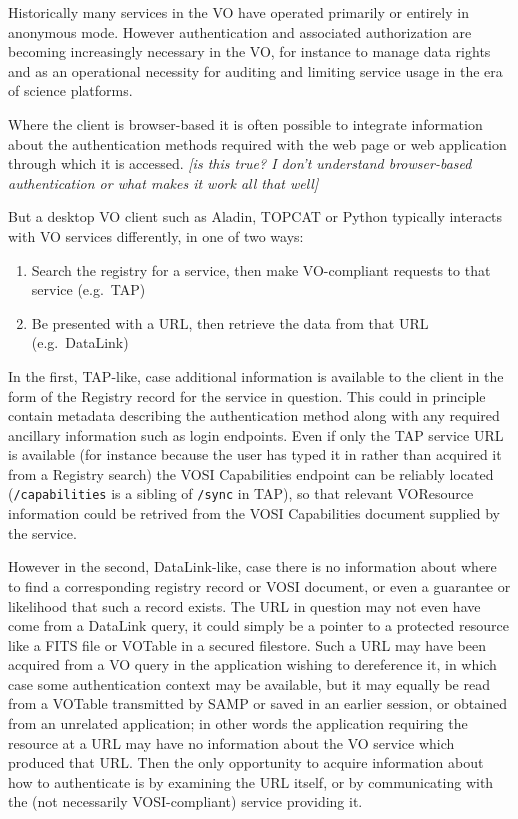 \documentclass[11pt,a4paper]{ivoa}
\begin{document}
Historically many services in the VO have operated primarily or
entirely in anonymous mode.
However authentication and associated authorization
are becoming increasingly necessary in the VO,
for instance to manage data rights and as an operational necessity for
auditing and limiting service usage in the era of science platforms.

Where the client is browser-based
it is often possible to integrate information about the authentication
methods required with the web page or web application through which
it is accessed.
{\em [is this true?  I don't understand browser-based authentication
or what makes it work all that well]}

But a desktop VO client such as Aladin, TOPCAT or Python
typically interacts with VO services differently, in one of two
ways:
\begin{enumerate}
\item Search the registry for a service, then make VO-compliant
      requests to that service (e.g.\ TAP)
\item Be presented with a URL, then retrieve the data from that URL
      (e.g.\ DataLink)
\end{enumerate}
In the first, TAP-like, case additional information is available to the
client in the form of the Registry record for the service in question.
This could in principle contain metadata describing the authentication
method along with any required ancillary information such as
login endpoints.
Even if only the TAP service URL is available
(for instance because the user has typed it in rather than acquired it
from a Registry search) the VOSI Capabilities endpoint can be reliably
located ({\tt /capabilities} is a sibling of {\tt /sync} in TAP),
so that relevant VOResource information could be retrived from the VOSI
Capabilities document supplied by the service.

However in the second, DataLink-like, case
there is no information about where to find a corresponding
registry record or VOSI document,
or even a guarantee or likelihood that such a record exists.
The URL in question may not even have come from a DataLink query,
it could simply be a pointer to a protected resource like a
FITS file or VOTable in a secured filestore.
Such a URL may have been acquired from a VO query in the application
wishing to dereference it, in which case some authentication context
may be available,
but it may equally be read from a VOTable transmitted by SAMP
or saved in an earlier session, or obtained from an unrelated application;
in other words the application requiring the resource at a URL may
have no information about the VO service which produced that URL.
Then the only opportunity to acquire information about how to authenticate
is by examining the URL itself, or by communicating with the
(not necessarily VOSI-compliant) service providing it.
\end{document}
